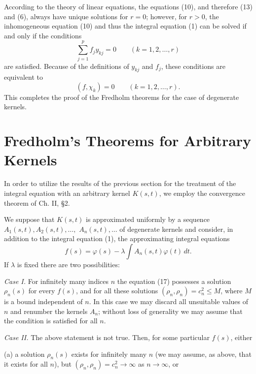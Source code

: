 According to the theory of linear equations, the equations (10), and therefore (13) and (6), always have unique solutions for $r=0$; however, for $r>0$, the inhomogeneous equation (10) and thus the integral equation (1) can be solved if and only if the conditions
\begin{equation}\tag{15}
\sum_{j=1}^{p}f_jy_{kj}=0
\qquad (k=1,2,\ldots,r)
\end{equation}
are satisfied. Because of the definitions of $y_{kj}$ and $f_j$, these conditions are equivalent to
\begin{equation}\tag{16}
(f,\chi_k)=0
\qquad (k=1,2,\ldots,r).
\end{equation}
This completes the proof of the Fredholm theorems for the case of degenerate kernels.

\section{Fredholm's Theorems for Arbitrary Kernels}
In order to utilize the results of the previous section for the treatment of the integral equation with an arbitrary kernel $K(s,t)$, we employ the convergence theorem of Ch. II, \S2.

We suppose that $K(s,t)$ is approximated uniformly by a sequence $A_1(s,t),A_2(s,t),\ldots,$ $A_n(s,t),\ldots$ of degenerate kernels and consider, in addition to the integral equation (1), the approximating integral equations
\begin{equation}\tag{17}
f(s)=\varphi(s)-\lambda\int A_n(s,t)\varphi(t)\,dt.
\end{equation}
If $\lambda$ is fixed there are two possibilities:

\emph{Case I.} For infinitely many indices $n$ the equation (17) possesses a solution $\rho_n(s)$ for every $f(s)$, and for all these solutions $(\rho_n,\rho_n)=c_n^2\le M$, where $M$ is a bound independent of $n$. In this case we may discard all unsuitable values of $n$ and renumber the kernels $A_n$; without loss of generality we may assume that the condition is satisfied for all $n$.

\emph{Case II.} The above statement is not true. Then, for some particular $f(s)$, either

(a) a solution $\rho_n(s)$ exists for infinitely many $n$ (we may assume, as above, that it exists for all $n$), but $(\rho_n,\rho_n)=c_n^2\to\infty$ as $n\to\infty$, or

